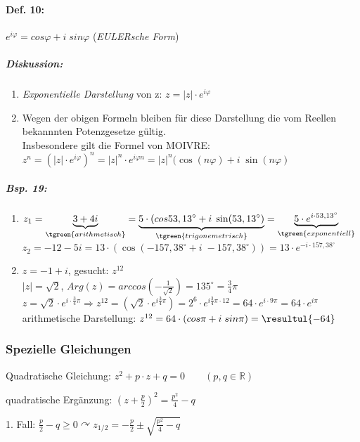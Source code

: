 \paragraph{Def. 10:} \parskp
$\boxed{e^{i\varphi}=cos\varphi+i\; sin \varphi}$ \qquad (\emph{EULERsche Form})
\subparagraph{Diskussion:}
\begin{enumerate}
\item \emph{Exponentielle Darstellung} von z: $\boxed{z=|z|\cdot e^{i\varphi}}$
\item Wegen der obigen Formeln bleiben für diese Darstellung die vom Reellen bekannnten Potenzgesetze gültig.\\
Insbesondere gilt die Formel von MOIVRE: \\
$\boxed{z^n=\left(|z|\cdot e^{i\varphi}\right)^n=|z|^n\cdot e^{i\varphi n}=|z|^n(\cos(n\varphi)+i\; \sin(n \varphi)}$
\end{enumerate}

\subparagraph{Bsp. 19:}
\begin{enumerate}
[label=\alph*.)]
\item $z_1=\underbrace{3+4i}_{\tgreen{arithmetisch}}=\underbrace{5\cdot (cos 53,13^{\circ}+i\; \sin(53,13^{\circ})}_{\tgreen{trigonemetrisch}}=\underbrace{5\cdot e^{i\cdot 53,13^{\circ}}}_{\tgreen{exponentiell}}$\\
$z_2=-12-5i=13\cdot (\cos(-157,38^{\circ}+i\; 
-157,38^{\circ}))=13\cdot e^{-i\cdot 157,38^{\circ}}$
\item $z=-1+i$, gesucht: $z^{12}$\\
$|z|=\sqrt{2}$, $Arg(z)=arccos\left(-\frac{1}{\sqrt{2}}\right)=135^{\circ}=\frac{3}{4}\pi$\\
$z=\sqrt{2}\cdot e^{i\cdot \frac{3}{4}\pi}\Rightarrow z^12=\left(\sqrt{2}\cdot e^{i\frac{3}{4}\pi}\right)=2^6\cdot e^{i\frac{3}{4}\pi \cdot 12}=64 \cdot e ^{i\cdot 9 \pi}=64\cdot e^{i\pi}$\\
arithmetische Darstellung: $z^{12}=64\cdot (cos\pi+i\; sin\pi)=\resultul{-64}$
\end{enumerate}

\subsubsection{Spezielle Gleichungen}
Quadratische Gleichung: $z^2+p\cdot z+q=0 \qquad (p,q \in \mathbb{R})$

quadratische Ergänzung: $\left(z+\frac{p}{2}\right)^2=\frac{p^2}{4}-q$

1. Fall: $\frac{p}{2}-q \geq 0 \curvearrowright z_{1/2}=-\frac{p}{2}\pm \sqrt{\frac{p^2}{4}-q}$

